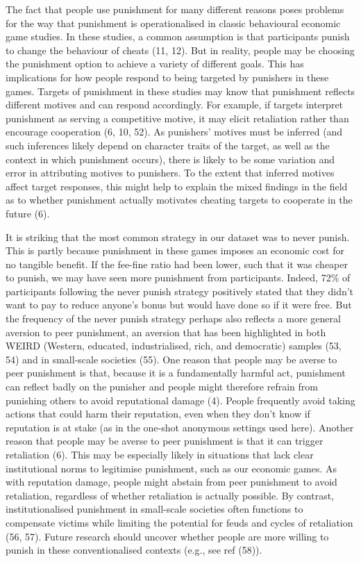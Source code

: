 \documentclass[
  english,
  man, donotrepeattitle,floatsintext]{apa6}
\begin{document}
The fact that people use punishment for many different reasons poses problems
for the way that punishment is operationalised in classic behavioural economic
game studies. In these studies, a common assumption is that participants punish
to change the behaviour of cheats (11, 12). But in reality, people
may be choosing the punishment option to achieve a variety of different goals.
This has implications for how people respond to being targeted by punishers in
these games. Targets of punishment in these studies may know that punishment
reflects different motives and can respond accordingly. For example, if targets
interpret punishment as serving a competitive motive, it may elicit retaliation
rather than encourage cooperation (6, 10, 52).
As punishers' motives must be inferred (and such inferences likely depend on
character traits of the target, as well as the context in which punishment
occurs), there is likely to be some variation and error in attributing motives
to punishers. To the extent that inferred motives affect target responses, this
might help to explain the mixed findings in the field as to whether punishment
actually motivates cheating targets to cooperate in the future (6).

It is striking that the most common strategy in our dataset was to never punish.
This is partly because punishment in these games imposes an economic cost for no
tangible benefit. If the fee-fine ratio had been lower, such that it was cheaper
to punish, we may have seen more punishment from participants. Indeed,
72\%
of participants following the never punish strategy positively stated that they
didn't want to pay to reduce anyone's bonus but would have done so if it were
free. But the frequency of the never punish strategy perhaps also reflects a
more general aversion to peer punishment, an aversion that has been highlighted
in both WEIRD (Western, educated, industrialised, rich, and democratic) samples
(53, 54) and in small-scale societies (55).
One reason that people may be averse to peer punishment is that, because it is
a fundamentally harmful act, punishment can reflect badly on the punisher and
people might therefore refrain from punishing others to avoid reputational
damage (4). People frequently avoid taking actions that could harm
their reputation, even when they don't know if reputation is at stake (as in the
one-shot anonymous settings used here). Another reason that people may be averse
to peer punishment is that it can trigger retaliation (6). This may be
especially likely in situations that lack clear institutional norms to
legitimise punishment, such as our economic games. As with reputation damage,
people might abstain from peer punishment to avoid retaliation, regardless of
whether retaliation is actually possible. By contrast, institutionalised
punishment in small-scale societies often functions to compensate victims while
limiting the potential for feuds and cycles of retaliation
(56, 57). Future research should uncover whether people are
more willing to punish in these conventionalised contexts (e.g., see ref
(58)).
\end{document}
